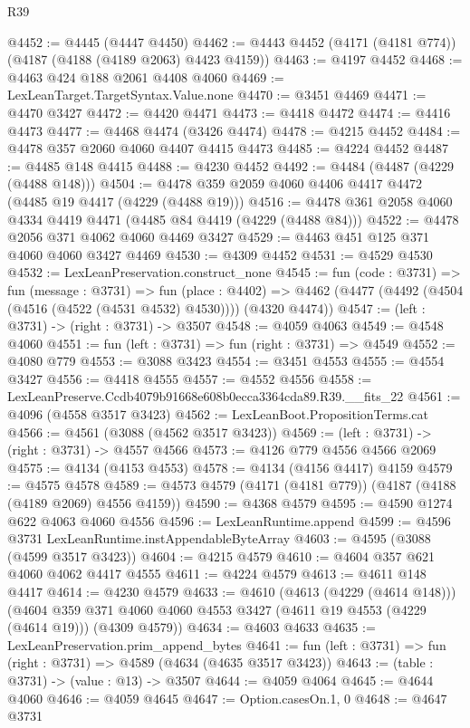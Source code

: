 \begin{lexlean}{R39}
\begin{coremodule}
@4452 := @4445 (@4447 @4450)
@4462 := @4443 @4452 (@4171 (@4181 @774)) (@4187 (@4188 (@4189 @2063) @4423 @4159))
@4463 := @4197 @4452
@4468 := @4463 @424 @188 @2061 @4408 @4060
@4469 := LexLeanTarget.TargetSyntax.Value.none
@4470 := @3451 @4469
@4471 := @4470 @3427
@4472 := @4420 @4471
@4473 := @4418 @4472
@4474 := @4416 @4473
@4477 := @4468 @4474 (@3426 @4474)
@4478 := @4215 @4452
@4484 := @4478 @357 @2060 @4060 @4407 @4415 @4473
@4485 := @4224 @4452
@4487 := @4485 @148 @4415
@4488 := @4230 @4452
@4492 := @4484 (@4487 (@4229 (@4488 @148)))
@4504 := @4478 @359 @2059 @4060 @4406 @4417 @4472 (@4485 @19 @4417 (@4229 (@4488 @19)))
@4516 := @4478 @361 @2058 @4060 @4334 @4419 @4471 (@4485 @84 @4419 (@4229 (@4488 @84)))
@4522 := @4478 @2056 @371 @4062 @4060 @4469 @3427
@4529 := @4463 @451 @125 @371 @4060 @4060 @3427 @4469
@4530 := @4309 @4452
@4531 := @4529 @4530
@4532 := LexLeanPreservation.construct_none
@4545 := fun (code : @3731) =>
  fun (message : @3731) =>
  fun (place : @4402) =>
  @4462 (@4477 (@4492 (@4504 (@4516 (@4522 (@4531 @4532) @4530)))) (@4320 @4474))
@4547 := (left : @3731) -> (right : @3731) -> @3507
@4548 := @4059 @4063
@4549 := @4548 @4060
@4551 := fun (left : @3731) => fun (right : @3731) => @4549
@4552 := @4080 @779
@4553 := @3088 @3423
@4554 := @3451 @4553
@4555 := @4554 @3427
@4556 := @4418 @4555
@4557 := @4552 @4556
@4558 := LexLeanPreserve.Ccdb4079b91668e608b0ecca3364cda89.R39.__fits_22
@4561 := @4096 (@4558 @3517 @3423)
@4562 := LexLeanBoot.PropositionTerms.cat
@4566 := @4561 (@3088 (@4562 @3517 @3423))
@4569 := (left : @3731) -> (right : @3731) -> @4557 @4566
@4573 := @4126 @779 @4556 @4566 @2069
@4575 := @4134 (@4153 @4553)
@4578 := @4134 (@4156 @4417) @4159
@4579 := @4575 @4578
@4589 := @4573 @4579 (@4171 (@4181 @779)) (@4187 (@4188 (@4189 @2069) @4556 @4159))
@4590 := @4368 @4579
@4595 := @4590 @1274 @622 @4063 @4060 @4556
@4596 := LexLeanRuntime.append
@4599 := @4596 @3731 LexLeanRuntime.instAppendableByteArray
@4603 := @4595 (@3088 (@4599 @3517 @3423))
@4604 := @4215 @4579
@4610 := @4604 @357 @621 @4060 @4062 @4417 @4555
@4611 := @4224 @4579
@4613 := @4611 @148 @4417
@4614 := @4230 @4579
@4633 := @4610
    (@4613 (@4229 (@4614 @148)))
    (@4604 @359 @371 @4060 @4060 @4553 @3427 (@4611 @19 @4553 (@4229 (@4614 @19))) (@4309 @4579))
@4634 := @4603 @4633
@4635 := LexLeanPreservation.prim_append_bytes
@4641 := fun (left : @3731) => fun (right : @3731) => @4589 (@4634 (@4635 @3517 @3423))
@4643 := (table : @3731) -> (value : @13) -> @3507
@4644 := @4059 @4064
@4645 := @4644 @4060
@4646 := @4059 @4645
@4647 := Option.casesOn.{1, 0}
@4648 := @4647 @3731

\end{coremodule}
\end{lexlean}
